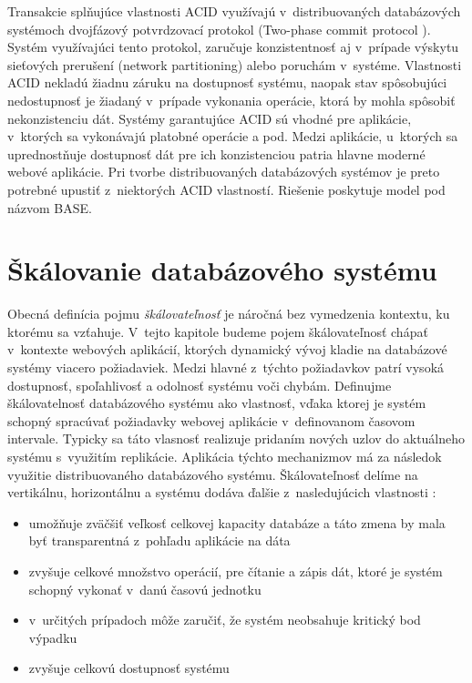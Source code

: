\documentclass[11pt,twoside,a4paper]{book}
\begin{document}
Transakcie splňujúce vlastnosti ACID využívajú v~distribuovaných databázových systémoch dvojfázový potvrdzovací protokol (Two-phase commit protocol \cite{bernstein1987concurrency}). Systém využívajúci tento protokol, zaručuje konzistentnosť aj v~prípade výskytu sieťových prerušení (network partitioning) alebo poruchám v~systéme. Vlastnosti ACID nekladú žiadnu záruku na dostupnosť systému, naopak stav spôsobujúci nedostupnosť je žiadaný v~prípade vykonania operácie, ktorá by mohla spôsobiť nekonzistenciu dát. Systémy garantujúce ACID sú vhodné pre aplikácie, v~ktorých sa vykonávajú platobné operácie a pod. Medzi aplikácie, u~ktorých sa uprednostňuje dostupnosť dát pre ich konzistenciou patria hlavne moderné webové aplikácie. Pri tvorbe distribuovaných databázových systémov je preto potrebné upustiť z~niektorých ACID vlastností. Riešenie poskytuje model pod názvom BASE.


\section{Škálovanie databázového systému} %
Obecná definícia pojmu \emph{škálovateľnosť} \cite{bondi2000characteristics} je náročná  bez vymedzenia kontextu, ku ktorému sa vzťahuje. V~tejto kapitole budeme pojem škálovateľnosť chápať v~kontexte webových aplikácií, ktorých dynamický vývoj kladie na databázové systémy viacero požiadaviek. Medzi hlavné z~týchto požiadavkov patrí vysoká dostupnosť, spoľahlivosť a odolnosť systému voči chybám. Definujme škálovatelnosť databázového systému ako vlastnosť, vďaka ktorej je systém schopný spracúvať požiadavky webovej aplikácie v~definovanom časovom intervale. Typicky sa táto vlasnosť realizuje pridaním nových uzlov do aktuálneho systému s~využitím replikácie. Aplikácia týchto mechanizmov má za následok využitie distribuovaného databázového systému. Škálovateľnosť delíme na vertikálnu, horizontálnu a systému dodáva ďalšie z~nasledujúcich vlastnosti \cite{hewitt2010cassandra}:
\begin{itemize}
 \item umožňuje zväčšiť veľkosť celkovej kapacity databáze a táto zmena by mala byť transparentná z~pohľadu aplikácie na dáta
  \item zvyšuje celkové množstvo operácií, pre čítanie a zápis dát, ktoré je systém schopný vykonať v~danú časovú jednotku
  \item v~určitých prípadoch môže zaručiť, že systém neobsahuje kritický bod výpadku
  \item zvyšuje celkovú dostupnosť systému
\end{itemize}
\end{document}
